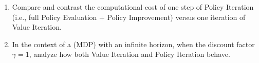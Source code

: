 \documentclass[12pt]{article}
\begin{document}
{{\begin{enumerate}[resume*]
    \item Compare and contrast the computational cost of one step of Policy Iteration (i.e., full Policy Evaluation + Policy Improvement) versus one iteration of Value Iteration.  

    \item In the context of a (MDP) with an infinite horizon, when the discount factor \( \gamma = 1 \), analyze how both Value Iteration and Policy Iteration behave.

















\end{enumerate}}}
\end{document}
